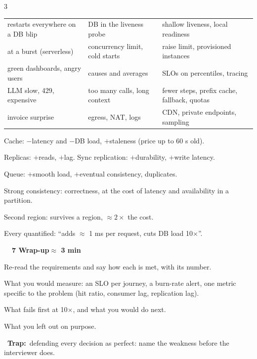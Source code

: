 \documentclass[10pt,a4paper]{article}
\newcommand{\sect}[4]{\par\vspace{.35em}%
  \begin{tcolorbox}[enhanced,colback=#1,colframe=#1,boxrule=0pt,arc=2pt,left=4pt,right=4pt,top=1.5pt,bottom=1.5pt,before skip=0pt,after skip=2pt]
    {\color{white}\small\bfseries #2\ \ #3\hfill{\scriptsize\mdseries #4}}
  \end{tcolorbox}}
\newcommand{\sub}[2]{\par\vspace{.12em}{\color{#1}\bfseries\small #2}\par\vspace{-.05em}}
\newcommand{\trap}[1]{\par{\color{wrong}\faExclamationTriangle}\ {\color{wrong}\bfseries Trap:}\ #1\par}
\begin{document}
\begin{multicols*}{3}
{\begin{tabularx}{\linewidth}{@{}>{\raggedright\arraybackslash}p{2.15cm}>{\raggedright\arraybackslash}p{1.95cm}>{\raggedright\arraybackslash}X@{}}
  restarts everywhere on a DB blip & DB in the liveness probe & shallow liveness, local readiness \\
  429 at a burst (serverless) & concurrency limit, cold starts & raise limit, provisioned instances \\
  green dashboards, angry users & causes and averages & SLOs on percentiles, tracing \\
  LLM slow, 429, expensive & too many calls, long context & fewer steps, prefix cache, fallback, quotas \\
  invoice surprise & egress, NAT, logs & CDN, private endpoints, sampling \\
\end{tabularx}}

\sub{stD}{Trade-offs to say out loud}
\begin{bul}
  \item Cache: $-$latency and $-$DB load, $+$staleness (price up to 60 s old).
  \item Replicas: $+$reads, $+$lag. Sync replication: $+$durability, $+$write latency.
  \item Queue: $+$smooth load, $+$eventual consistency, duplicates.
  \item Strong consistency: correctness, at the cost of latency and availability in a partition.
  \item Second region: survives a region, $\approx 2\times$ the cost.
  \item Every quantified: ``adds $\approx$ 1 ms per request, cuts DB load 10$\times$''.
\end{bul}

\columnbreak
\sect{stA}{\faFlagCheckered}{7 Wrap-up}{$\approx$ 3 min}
\begin{bul}
  \item Re-read the requirements and say how each is met, with its number.
  \item What you would measure: an SLO per journey, a burn-rate alert, one metric specific to the problem (hit ratio, consumer lag, replication lag).
  \item What fails first at 10$\times$, and what you would do next.
  \item What you left out on purpose.
\end{bul}
\trap{defending every decision as perfect: name the weakness before the interviewer does.}


\end{multicols*}
\end{document}
